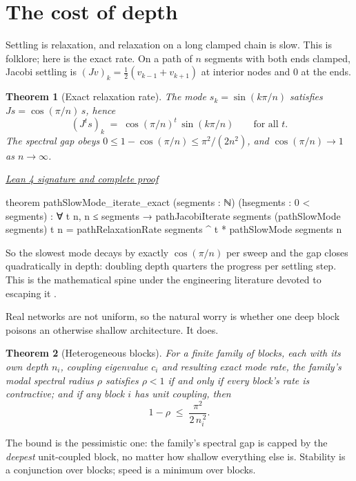 \documentclass[11pt]{article}
\newtheorem{theorem}{Theorem}[section]
\newcommand{\leancommit}{f3a31db36bb2f944312ee31c1d86c2758109e83a}
\newcommand{\leansignaturelink}[2]{%
  \par\Needspace{0.3\textheight}\smallskip\noindent
  \href{https://github.com/zariuq/MeTTapedia/blob/\leancommit/#1\#L#2}{%
    \scriptsize\itshape Lean 4 signature and complete proof}\par\nobreak}
\begin{document}
\section{The cost of depth}
\label{sec:depth}

Settling is relaxation, and relaxation on a long clamped chain is slow. This is folklore;
here is the exact rate. On a path of $n$ segments with both ends clamped, Jacobi settling
is $(Jv)_k = \tfrac12(v_{k-1}+v_{k+1})$ at interior nodes and $0$ at the ends.

\begin{theorem}[Exact relaxation rate]\label{thm:depth}
The mode $s_k = \sin(k\pi/n)$ satisfies $Js = \cos(\pi/n)\, s$, hence
\[
(J^t s)_k \;=\; \cos(\pi/n)^t \, \sin(k\pi/n)
\qquad\text{for all } t .
\]
The spectral gap obeys $0 \le 1 - \cos(\pi/n) \le \pi^2/(2n^2)$, and
$\cos(\pi/n) \to 1$ as $n \to \infty$.
\end{theorem}

\leansignaturelink{lean/mettapedia/Mettapedia/MachineLearning/NeuralNetworks/%
PredictiveCoding/DepthPathology.lean}{106}
\begin{leansignature}
theorem pathSlowMode_iterate_exact
    (segments : ℕ) (hsegments : 0 < segments) :
    ∀ t n, n ≤ segments →
      pathJacobiIterate segments (pathSlowMode segments) t n =
        pathRelaxationRate segments ^ t * pathSlowMode segments n
\end{leansignature}

So the slowest mode decays by exactly $\cos(\pi/n)$ per sweep and the gap closes
quadratically in depth: doubling depth quarters the progress per settling step. This is
the mathematical spine under the engineering literature devoted to escaping it
\cite{goemaere2025}.

Real networks are not uniform, so the natural worry is whether one deep block poisons an
otherwise shallow architecture. It does.

\begin{theorem}[Heterogeneous blocks]\label{thm:het}
For a finite family of blocks, each with its own depth $n_i$, coupling eigenvalue $c_i$
and resulting exact mode rate, the family's modal spectral radius $\rho$ satisfies
$\rho < 1$ if and only if every block's rate is contractive; and if any block $i$ has
unit coupling, then
\[
1 - \rho \;\le\; \frac{\pi^2}{2\,n_i^{\,2}} .
\]
\end{theorem}

The bound is the pessimistic one: the family's spectral gap is capped by the
\emph{deepest} unit-coupled block, no matter how shallow everything else is. Stability
is a conjunction over blocks; speed is a minimum over blocks.
\end{document}
